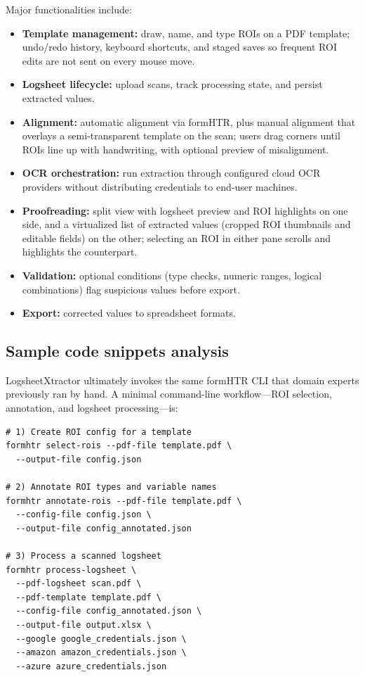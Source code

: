\documentclass[preprint,12pt,a4paper]{elsarticle}
\begin{document}
Major functionalities include:

\begin{itemize}
  \item \textbf{Template management:} draw, name, and type ROIs on a PDF template; undo/redo history, keyboard shortcuts, and staged saves so frequent ROI edits are not sent on every mouse move.
  \item \textbf{Logsheet lifecycle:} upload scans, track processing state, and persist extracted values.
  \item \textbf{Alignment:} automatic alignment via formHTR, plus manual alignment that overlays a semi-transparent template on the scan; users drag corners until ROIs line up with handwriting, with optional preview of misalignment.
  \item \textbf{OCR orchestration:} run extraction through configured cloud OCR providers without distributing credentials to end-user machines.
  \item \textbf{Proofreading:} split view with logsheet preview and ROI highlights on one side, and a virtualized list of extracted values (cropped ROI thumbnails and editable fields) on the other; selecting an ROI in either pane scrolls and highlights the counterpart.
  \item \textbf{Validation:} optional conditions (type checks, numeric ranges, logical combinations) flag suspicious values before export.
  \item \textbf{Export:} corrected values to spreadsheet formats.
\end{itemize}

\subsection{Sample code snippets analysis}
\label{sec:snippets}

LogsheetXtractor ultimately invokes the same formHTR CLI that domain experts previously ran by hand.
A minimal command-line workflow---ROI selection, annotation, and logsheet processing---is:

\begin{lstlisting}
# 1) Create ROI config for a template
formhtr select-rois --pdf-file template.pdf \
  --output-file config.json

# 2) Annotate ROI types and variable names
formhtr annotate-rois --pdf-file template.pdf \
  --config-file config.json \
  --output-file config_annotated.json

# 3) Process a scanned logsheet
formhtr process-logsheet \
  --pdf-logsheet scan.pdf \
  --pdf-template template.pdf \
  --config-file config_annotated.json \
  --output-file output.xlsx \
  --google google_credentials.json \
  --amazon amazon_credentials.json \
  --azure azure_credentials.json
\end{lstlisting}
\end{document}
